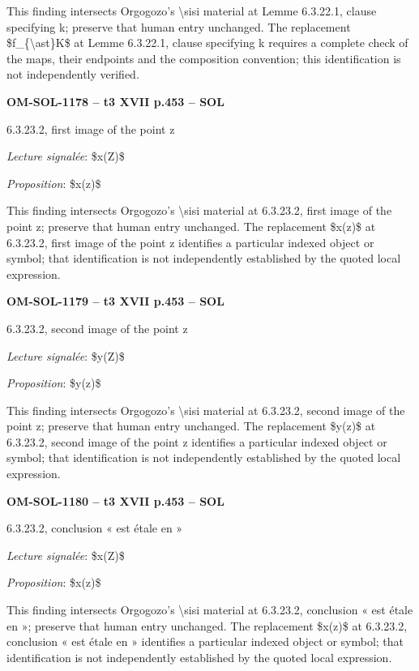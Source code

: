 This finding intersects Orgogozo's \textbackslash{}sisi material at Lemme 6.3.22.1, clause specifying k; preserve that human entry unchanged. The replacement \$f\_\{\textbackslash{}ast\}K\$ at Lemme 6.3.22.1, clause specifying k requires a complete check of the maps, their endpoints and the composition convention; this identification is not independently verified.\par
\par\noindent\textbf{OM-SOL-1178 -- t3 XVII p.453 -- SOL}\par
6.3.23.2, first image of the point z\par
\emph{Lecture signalée}: \$x(Z)\$\par
\emph{Proposition}: \$x(z)\$\par
This finding intersects Orgogozo's \textbackslash{}sisi material at 6.3.23.2, first image of the point z; preserve that human entry unchanged. The replacement \$x(z)\$ at 6.3.23.2, first image of the point z identifies a particular indexed object or symbol; that identification is not independently established by the quoted local expression.\par
\par\noindent\textbf{OM-SOL-1179 -- t3 XVII p.453 -- SOL}\par
6.3.23.2, second image of the point z\par
\emph{Lecture signalée}: \$y(Z)\$\par
\emph{Proposition}: \$y(z)\$\par
This finding intersects Orgogozo's \textbackslash{}sisi material at 6.3.23.2, second image of the point z; preserve that human entry unchanged. The replacement \$y(z)\$ at 6.3.23.2, second image of the point z identifies a particular indexed object or symbol; that identification is not independently established by the quoted local expression.\par
\par\noindent\textbf{OM-SOL-1180 -- t3 XVII p.453 -- SOL}\par
6.3.23.2, conclusion « est étale en »\par
\emph{Lecture signalée}: \$x(Z)\$\par
\emph{Proposition}: \$x(z)\$\par
This finding intersects Orgogozo's \textbackslash{}sisi material at 6.3.23.2, conclusion « est étale en »; preserve that human entry unchanged. The replacement \$x(z)\$ at 6.3.23.2, conclusion « est étale en » identifies a particular indexed object or symbol; that identification is not independently established by the quoted local expression.\par
